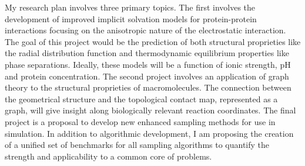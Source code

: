 \documentclass[]{scrartcl}
\begin{document}
\begin{cleanCV}
\vspace{2em}

My research plan involves three primary topics. 
The first involves the development of improved implicit solvation models for protein-protein interactions focusing on the anisotropic nature of the electrostatic interaction.
The goal of this project would be the prediction of both structural proprieties like the radial distribution function and thermodynamic equilibrium properties like phase separations. 
Ideally, these models will be a function of ionic strength, pH and protein concentration.
The second project involves an application of graph theory to the structural proprieties of macromolecules.
The connection between the geometrical structure and the topological contact map, represented as a graph, will give insight along biologically relevant reaction coordinates.
The final project is a proposal to develop new enhanced sampling methods for use in simulation.
In addition to algorithmic development, I am proposing the creation of a unified set of benchmarks for all sampling algorithms to quantify the strength and applicability to a common core of problems.
\end{cleanCV}
\end{document}
